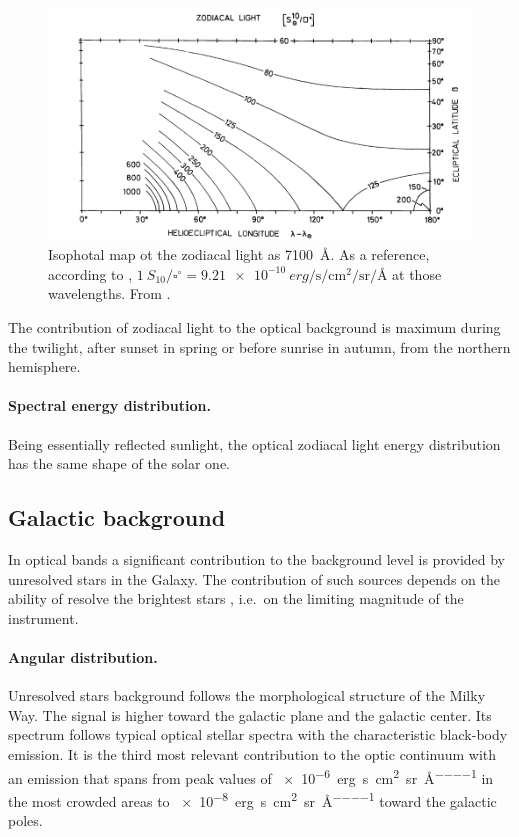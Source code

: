 \begin{figure}
	\centering
	\includegraphics[width=.8\textwidth]{./2_natural_sky/zodiacal_distribution}
	\caption{Isophotal map ot the zodiacal light as \SI{7100}{\angstrom}. As a reference, according to \cite{leinert19981997}, $\SI{1}{S}_{10}/\square^\circ = \SI{9.21e-10}{erg\per\second \per\centi\metre\squared \per\steradian\per\angstrom}$ at those wavelengths. From \cite{frey1974photometry}.\label{fig:zodiacal_distribution}}
\end{figure}

The contribution of zodiacal light to the optical background is maximum during the twilight, after sunset in spring or before sunrise in autumn, from the northern hemisphere.

\paragraph{Spectral energy distribution.} Being essentially reflected sunlight, the optical zodiacal light energy distribution has the same shape of the solar one.

\subsection{Galactic background}
In optical bands a significant contribution to the background level is provided by unresolved stars in the Galaxy. The contribution of such sources depends on the ability of resolve the brightest stars \cite{leinert19981997}, i.e.\ on the limiting magnitude of the instrument.

\paragraph{Angular distribution.} Unresolved stars background follows the morphological structure of the Milky Way. The signal is higher toward the galactic plane and the galactic center.  Its spectrum follows typical optical stellar spectra with the characteristic black-body emission. It is the third most relevant contribution to the optic continuum with an emission that spans from peak values of \SI{e-6}{erg\per\second \per\centi\metre\squared \per\steradian\per\angstrom} in the most crowded areas to \SI{e-8}{erg\per\second \per\centi\metre\squared \per\steradian\per\angstrom} toward the galactic poles.

